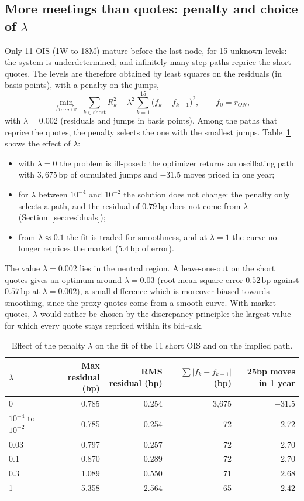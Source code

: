 \documentclass[11pt,a4paper]{article}
\theoremstyle{plain}
\theoremstyle{definition}
\newcommand{\bp}{\,\mathrm{bp}}
\begin{document}
\subsection{More meetings than quotes: penalty and choice of $\lambda$}
Only 11 OIS (1W to 18M) mature before the last node, for 15 unknown levels: the system is underdetermined, and infinitely many step paths reprice the short quotes. The levels are therefore obtained by least squares on the residuals (in basis points), with a penalty on the jumps,
\begin{equation}
    \min_{f_1,\dots,f_{15}}\ \sum_{k\in\text{short}}R_k^2+\lambda^2\sum_{k=1}^{15}\bigl(f_k-f_{k-1}\bigr)^2,\qquad f_0=r_{ON},
    \label{eq:penalty}
\end{equation}
with $\lambda=0.002$ (residuals and jumps in basis points). Among the paths that reprice the quotes, the penalty selects the one with the smallest jumps. Table~\ref{tab:lambda} shows the effect of $\lambda$:
\begin{itemize}
    \item with $\lambda=0$ the problem is ill-posed: the optimizer returns an oscillating path with $3{,}675\bp$ of cumulated jumps and $-31.5$ moves priced in one year;
    \item for $\lambda$ between $10^{-4}$ and $10^{-2}$ the solution does not change: the penalty only selects a path, and the residual of $0.79\bp$ does not come from $\lambda$ (Section~\ref{sec:residuals});
    \item from $\lambda\approx0.1$ the fit is traded for smoothness, and at $\lambda=1$ the curve no longer reprices the market ($5.4\bp$ of error).
\end{itemize}
The value $\lambda=0.002$ lies in the neutral region. A leave-one-out on the short quotes gives an optimum around $\lambda=0.03$ (root mean square error $0.52\bp$ against $0.57\bp$ at $\lambda=0.002$), a small difference which is moreover biased towards smoothing, since the proxy quotes come from a smooth curve. With market quotes, $\lambda$ would rather be chosen by the discrepancy principle: the largest value for which every quote stays repriced within its bid--ask.

\begin{table}[htbp]
\centering
\small
\begin{tabular}{@{}lrrrr@{}}
\toprule
$\lambda$ & Max residual (bp) & RMS residual (bp) & $\sum|f_k-f_{k-1}|$ (bp) & 25bp moves in 1 year \\
\midrule
0 & 0.785 & 0.254 & 3{,}675 & $-31.5$ \\
$10^{-4}$ to $10^{-2}$ & 0.785 & 0.254 & 72 & 2.72 \\
0.03 & 0.797 & 0.257 & 72 & 2.70 \\
0.1 & 0.870 & 0.289 & 72 & 2.70 \\
0.3 & 1.089 & 0.550 & 71 & 2.68 \\
1 & 5.358 & 2.564 & 65 & 2.42 \\
\bottomrule
\end{tabular}
\caption{Effect of the penalty $\lambda$ on the fit of the 11 short OIS and on the implied path.}
\label{tab:lambda}
\end{table}
\end{document}
